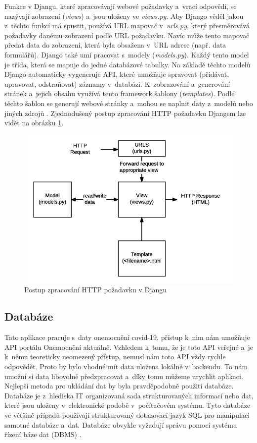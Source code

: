 Funkce v Djangu, které zpracovávají webové požadavky a~vrací odpovědi, se nazývají zobrazení (\emph{views}) a~jsou uloženy ve \emph{views.py}. Aby Django věděl jakou z~těchto funkcí má spustit, používá URL mapovač v~\emph{urls.py}, který přesměrovává požadavky danému zobrazení podle URL požadavku. Navíc může tento mapovač předat data do zobrazení, která byla obsažena v~URL adrese (např. data formulářů). Django také umí pracovat s~modely (\emph{models.py}). Každý tento model je třída, která se mapuje do jedné databázové tabulky. Na základě těchto modelů Django automaticky vygeneruje API, které umožňuje spravovat (přidávat, upravovat, odstraňovat) záznamy v~databázi. K~zobrazování a~generování stránek a~jejich obsahu využívá tento framework šablony (\emph{templates}). Podle těchto šablon se generují webové stránky a~mohou se naplnit daty z~modelů nebo jiných zdrojů \cite{what-is-django}. Zjednodušený postup zpracování HTTP požadavku Djangem lze vidět na obrázku \ref{fig:DjangoDiagram}.

\begin{figure}
	\centering
	\includegraphics[]{Pictures/django-diagram.png}
	\caption{Postup zpracování HTTP požadavku v Djangu \cite{what-is-django}}
	\label{fig:DjangoDiagram}
\end{figure}

\subsection{Databáze}
\label{sec:DatabaseTheory}

Tato aplikace pracuje s~daty onemocnění covid-19, přístup k~nim nám umožňuje API portálu Onemocnění aktuálně. Vzhledem k~tomu, že je toto API veřejné a~je k~němu teoreticky neomezený přístup, nemusí nám toto API vždy rychle odpovědět. Proto by bylo vhodné mít data uložena lokálně v~backendu. To nám umožní si data libovolně předzpracovat a~díky tomu můžeme urychlit aplikaci. Nejlepší metoda pro ukládání dat by byla pravděpodobně použití databáze. Databáze je z~hlediska IT organizovaná sada strukturovaných informací nebo dat, které jsou uloženy v~elektronické podobě v~počítačovém systému. Tyto databáze ve většině případů používají strukturovaný dotazovací jazyk SQL pro manipulaci samotné databáze a~dat. Databáze obvykle vyžadují správu pomocí systému řízení báze dat (DBMS) \cite{what-is-database-oracle}.

